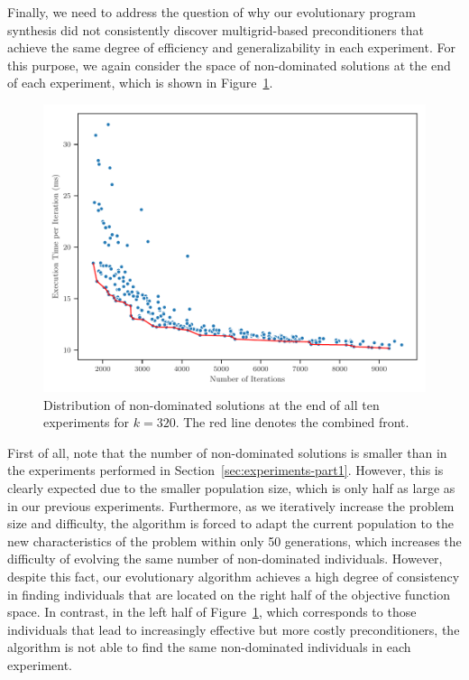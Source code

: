 Finally, we need to address the question of why our evolutionary program synthesis did not consistently discover multigrid-based preconditioners that achieve the same degree of efficiency and generalizability in each experiment.
For this purpose, we again consider the space of non-dominated solutions at the end of each experiment, which is shown in Figure~\ref{fig:pareto-front-helmholtz}.
\begin{figure}
	\includegraphics[width=\textwidth]{figures/pareto-front.pdf}
	\caption{Distribution of non-dominated solutions at the end of all ten experiments for $k = 320$. The red line denotes the combined front.}
	\label{fig:pareto-front-helmholtz}
\end{figure}
First of all, note that the number of non-dominated solutions is smaller than in the experiments performed in Section~\ref{sec:experiments-part1}.
However, this is clearly expected due to the smaller population size, which is only half as large as in our previous experiments.
Furthermore, as we iteratively increase the problem size and difficulty, the algorithm is forced to adapt the current population to the new characteristics of the problem within only 50 generations, which increases the difficulty of evolving the same number of non-dominated individuals. 
However, despite this fact, our evolutionary algorithm achieves a high degree of consistency in finding individuals that are located on the right half of the objective function space.
In contrast, in the left half of Figure~\ref{fig:pareto-front-helmholtz}, which corresponds to those individuals that lead to increasingly effective but more costly preconditioners, the algorithm is not able to find the same non-dominated individuals in each experiment.
